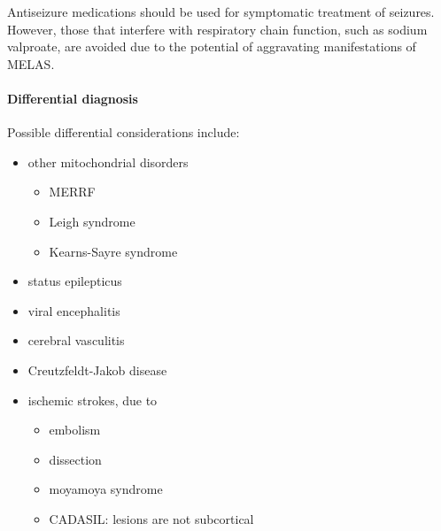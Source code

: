 Antiseizure medications should be used for symptomatic treatment of seizures. However, those that interfere with respiratory chain function, such as sodium valproate, are avoided due to the potential of aggravating manifestations of MELAS.

\paragraph{Differential diagnosis}

Possible differential considerations include:

\begin{itemize}
	\item
	other mitochondrial disorders
	
	\begin{itemize}
		\item
		MERRF
		\item
		Leigh syndrome
		\item
		Kearns-Sayre syndrome
	\end{itemize}
	\item
	status epilepticus
	\item
	viral encephalitis
	\item
	cerebral vasculitis
	\item
	Creutzfeldt-Jakob disease
	\item
	ischemic strokes, due to
	
	\begin{itemize}
		\item
		embolism
		\item
		dissection
		\item
		moyamoya syndrome
		\item
		CADASIL: lesions are not subcortical
	\end{itemize}
\end{itemize}